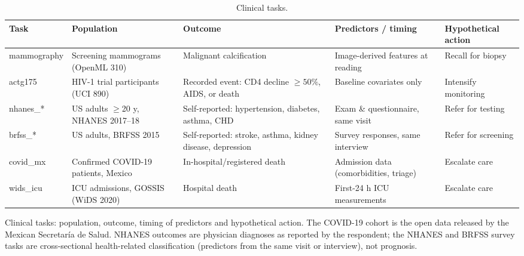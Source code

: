 \begin{table}[!t]
\centering
\scriptsize
{}
\setlength{\tabcolsep}{3pt}
\caption{Clinical tasks.}
\label{tab:tasks}
\begin{tabular}{@{}lllll@{}}
\toprule
Task & Population & Outcome & Predictors / timing & Hypothetical action \\
\midrule
mammography & Screening mammograms (OpenML 310) & Malignant calcification & Image-derived features at reading & Recall for biopsy \\
actg175 & HIV-1 trial participants (UCI 890) & Recorded event: CD4 decline $\geq50\%$, AIDS, or death & Baseline covariates only & Intensify monitoring \\
nhanes\_* & US adults $\geq$20 y, NHANES 2017--18 & Self-reported: hypertension, diabetes, asthma, CHD & Exam \& questionnaire, same visit & Refer for testing \\
brfss\_* & US adults, BRFSS 2015 & Self-reported: stroke, asthma, kidney disease, depression & Survey responses, same interview & Refer for screening \\
covid\_mx & Confirmed COVID-19 patients, Mexico & In-hospital/registered death & Admission data (comorbidities, triage) & Escalate care \\
wids\_icu & ICU admissions, GOSSIS (WiDS 2020) & Hospital death & First-24 h ICU measurements & Escalate care \\
\bottomrule
\end{tabular}

\vspace{2pt}
\parbox{\linewidth}{\justifying\scriptsize *Clinical tasks: population, outcome, timing of predictors and hypothetical action. The COVID-19 cohort is the open data released by the Mexican Secretaría de Salud. NHANES outcomes are physician diagnoses as reported by the respondent; the NHANES and BRFSS survey tasks are cross-sectional health-related classification (predictors from the same visit or interview), not prognosis.}
\end{table}
